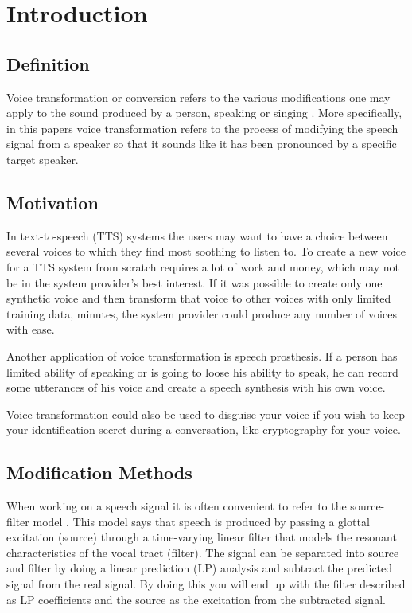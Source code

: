 \chapter{Introduction} %
\label{cha:introduction}
  

\section{Definition} %
\label{sec:definition}
Voice transformation or conversion refers to the various modifications one may apply to the sound produced by a person, speaking or singing \cite{stylianou08}. More specifically, in this papers voice transformation refers to the process of modifying the speech signal from a speaker so that it sounds like it has been pronounced by a specific target speaker. 

\section{Motivation} %
\label{sec:motivation}
In text-to-speech (TTS) systems the users may want to have a choice between several voices to which they find most soothing to listen to. To create a new voice for a TTS system from scratch requires a lot of work and money, which may not be in the system provider's best interest. If it was possible to create only one synthetic voice and then transform that voice to other voices with only limited training data,  minutes, the system provider could produce any number of voices with ease. 

Another application of voice transformation is speech prosthesis. If a person has limited ability of speaking or is going to loose his ability to speak, he can record some utterances of his voice and create a speech synthesis with his own voice.
 
Voice transformation could also be used to disguise your voice if you wish to keep your identification secret during a conversation, like cryptography for your voice. 

\section{Modification Methods} %
\label{sec:synthesis_methods}
When working on a speech signal it is often convenient to refer to the source-filter model \cite{taletek}. This model says that speech is produced by passing a glottal excitation (source) through a time-varying linear filter that models the resonant characteristics of the vocal tract (filter). The signal can be separated into source and filter by doing a linear prediction (LP) analysis and subtract the predicted signal from the real signal. By doing this you will end up with the filter described as LP coefficients and the source as the excitation from the subtracted signal.

